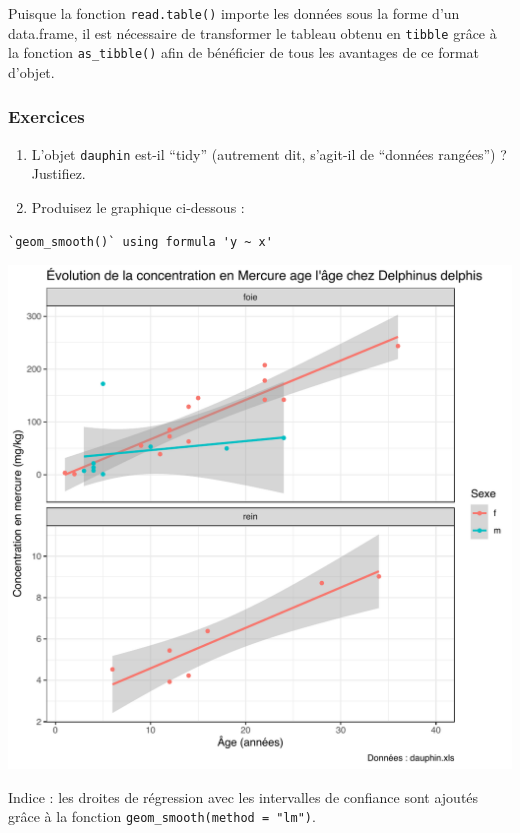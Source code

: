 \documentclass[
  a4paper,
]{article}
\providecommand{\tightlist}{%
  \setlength{\itemsep}{0pt}\setlength{\parskip}{0pt}}
\begin{document}
Puisque la fonction \texttt{read.table()} importe les données sous la forme d'un data.frame, il est nécessaire de transformer le tableau obtenu en \texttt{tibble} grâce à la fonction \texttt{as\_tibble()} afin de bénéficier de tous les avantages de ce format d'objet.

\hypertarget{Exo-10}{%
\subsubsection{Exercices}\label{Exo-10}}

\begin{enumerate}
\def\labelenumi{\arabic{enumi}.}
\tightlist
\item
  L'objet \texttt{dauphin} est-il ``tidy'' (autrement dit, s'agit-il de ``données rangées'') ? Justifiez.
\item
  Produisez le graphique ci-dessous :
\end{enumerate}

\begin{verbatim}
`geom_smooth()` using formula 'y ~ x'
\end{verbatim}

\begin{center}\includegraphics[width=0.9\linewidth]{figure/exercicedauphin-1} \end{center}

Indice : les droites de régression avec les intervalles de confiance sont ajoutés grâce à la fonction \texttt{geom\_smooth(method\ =\ "lm")}.
\end{document}
